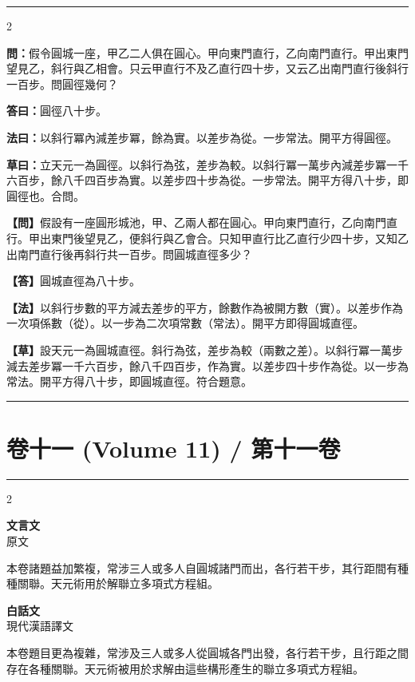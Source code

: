 \documentclass[11pt,a4paper]{article}
\newcommand{\longline}{\noindent\rule{\textwidth}{0.4pt}}
\newcommand{\wenC}[1]{\par\noindent\textbf{\textcolor{probcolor}{問：}}{#1}\par}
\newcommand{\daC}[1]{\par\noindent\textbf{\textcolor{anscolor}{答曰：}}{#1}\par}
\newcommand{\fayueC}[1]{\par\noindent\textbf{\textcolor{methodcolor}{法曰：}}{#1}\par}
\newcommand{\caoyueC}[1]{\par\noindent\textbf{草曰：}{#1}\par}
\newcommand{\wenM}[1]{\par\noindent\textbf{\textcolor{probcolor}{【問】}}{#1}\par}
\newcommand{\daM}[1]{\par\noindent\textbf{\textcolor{anscolor}{【答】}}{#1}\par}
\newcommand{\fayueM}[1]{\par\noindent\textbf{\textcolor{methodcolor}{【法】}}{#1}\par}
\newcommand{\caoyueM}[1]{\par\noindent\textbf{【草】}{#1}\par}
\newcommand{\leftlabel}{\begin{center}\textbf{\large\color{probcolor} 文言文}\\{\small 原文}\end{center}\vspace{0.3cm}}
\newcommand{\rightlabel}{\begin{center}\textbf{\large\color{methodcolor} 白話文}\\{\small 現代漢語譯文}\end{center}\vspace{0.3cm}}
\begin{document}
\vspace{0.3cm}
\longline

\begin{paracol}{2}

\wenC{假令圓城一座，甲乙二人俱在圓心。甲向東門直行，乙向南門直行。甲出東門望見乙，斜行與乙相會。只云甲直行不及乙直行四十步，又云乙出南門直行後斜行一百步。問圓徑幾何？}

\daC{圓徑八十步。}

\fayueC{以斜行冪內減差步冪，餘為實。以差步為從。一步常法。開平方得圓徑。}

\caoyueC{立天元一為圓徑。以斜行為弦，差步為較。以斜行冪一萬步內減差步冪一千六百步，餘八千四百步為實。以差步四十步為從。一步常法。開平方得八十步，即圓徑也。合問。}

\switchcolumn

\wenM{假設有一座圓形城池，甲、乙兩人都在圓心。甲向東門直行，乙向南門直行。甲出東門後望見乙，便斜行與乙會合。只知甲直行比乙直行少四十步，又知乙出南門直行後再斜行共一百步。問圓城直徑多少？}

\daM{圓城直徑為八十步。}

\fayueM{以斜行步數的平方減去差步的平方，餘數作為被開方數（實）。以差步作為一次項係數（從）。以一步為二次項常數（常法）。開平方即得圓城直徑。}

\caoyueM{設天元一為圓城直徑。斜行為弦，差步為較（兩數之差）。以斜行冪一萬步減去差步冪一千六百步，餘八千四百步，作為實。以差步四十步作為從。以一步為常法。開平方得八十步，即圓城直徑。符合題意。}

\end{paracol}

\vspace{0.3cm}
\longline


\newpage
\section{卷十一 (Volume 11) / 第十一卷}
\label{sec:vol11}

\longline

\begin{paracol}{2}
\leftlabel
本卷諸題益加繁複，常涉三人或多人自圓城諸門而出，各行若干步，其行距間有種種關聯。天元術用於解聯立多項式方程組。

\switchcolumn
\rightlabel
本卷題目更為複雜，常涉及三人或多人從圓城各門出發，各行若干步，且行距之間存在各種關聯。天元術被用於求解由這些構形產生的聯立多項式方程組。

\end{paracol}
\end{document}
